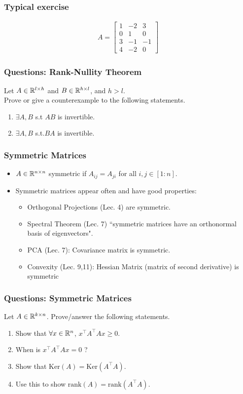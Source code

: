 \documentclass{beamer}
\begin{document}
\begin{frame}[t]
\frametitle{Typical exercise} 
\begin{align*}
A = 
\begin{bmatrix}
1 & -2 & 3 \\
0 & 1 & 0 \\
3 & -1 & -1 \\
4 & -2 & 0
\end{bmatrix}
\end{align*}
\pause
\pause
\end{frame}

\begin{frame}[t]
\frametitle{Questions: Rank-Nullity Theorem}
Let $A\in \mathbb{R}^{l\times h}$ and $B\in \mathbb{R}^{h\times l}$, and $h>l$.\\
Prove or give a counterexample to the following statements.
\begin{enumerate}
\item $\exists A,B$ s.t $AB$ is invertible.
\item $\exists A,B$ s.t.$BA$ is invertible.
\end{enumerate}
\pause
\pause
\pause
\end{frame}

\begin{frame}[t]
\frametitle{Symmetric Matrices}
\begin{itemize}
\item $A \in \mathbb{R}^{n\times n}$ symmetric if $A_{ij} = A_{ji}$ for all $i,j \in [1:n]$.
\item Symmetric matrices appear often and have good properties:
\begin{itemize}
\item Orthogonal Projections (Lec. 4) are symmetric.\\
\item Spectral Theorem (Lec. 7) ``symmetric matrices have an orthonormal basis of eigenvectors".\\
\item PCA (Lec. 7): Covariance matrix is symmetric.
\item Convexity (Lec. 9,11): Hessian Matrix (matrix of second derivative) is symmetric
\end{itemize}
\end{itemize}
\end{frame}

\begin{frame}[t]
\frametitle{Questions: Symmetric Matrices}
Let $A\in \mathbb{R}^{k \times n}$. Prove/answer the following statements.
\begin{enumerate}
\item Show that $\forall x\in\mathbb{R}^n$, $ x^\top A^\top Ax\geq0$.
\item When is $x^\top A^\top Ax = 0$ ?
\item Show that $\text{Ker}(A) = \text{Ker}(A^\top A)$.
\item Use this to show $\text{rank}(A)=\text{rank}(A^\top A)$.
\end{enumerate}
\pause
\pause
\pause
\pause
\end{frame}
\end{document}
